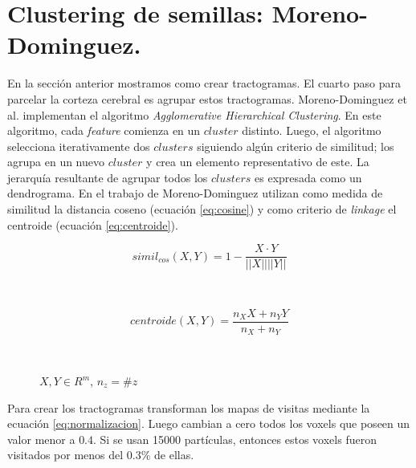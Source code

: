 \section{Clustering de semillas: Moreno-Dominguez.}
\label{sec:clustering_moreno}

En la secci\'on anterior mostramos como crear tractogramas. El cuarto paso
para parcelar la corteza cerebral es agrupar estos tractogramas.
Moreno-Dominguez et al. \cite{Moreno-Dominguez2014} implementan el
algoritmo \textit{Agglomerative Hierarchical Clustering}. En este
algoritmo, cada \textit{feature} comienza en un
$cluster$ distinto. Luego, el algoritmo selecciona iterativamente dos
$clusters$ siguiendo alg\'un criterio de similitud; los agrupa en un nuevo
$cluster$ y crea un elemento representativo de este. La jerarqu\'ia
resultante de agrupar todos los $clusters$ es expresada como un
dendrograma.
En el trabajo de Moreno-Dominguez utilizan como medida de similitud la
distancia coseno (ecuaci\'on \ref{eq:cosine}) y como criterio de 
\textit{linkage} el centroide (ecuaci\'on \ref{eq:centroide}).

\begin{figure}[h!]
                                                                                                                        
\begin{minipage}[b]{0.49\textwidth}
    \begin{equation}
        \label{eq:cosine}
        simil_{cos}(X,Y) = 1 - \frac{ X \cdot Y }{||X|| ||Y||}
    \end{equation}
\end{minipage} ~
\hfill
\begin{minipage}[b]{0.49\textwidth}
    \begin{equation}
        \label{eq:centroide}
        centroide(X,Y) = \frac{ n_X X + n_Y Y}{n_X + n_Y}
    \end{equation}
\end{minipage} ~

\centering
\vspace{0.5cm}
\small{$X, Y \in R^m$, $n_z = \#z$}

\end{figure}  

Para crear los tractogramas transforman los mapas de visitas mediante la
ecuaci\'on \ref{eq:normalizacion}. Luego cambian a cero todos los voxels
que poseen un valor menor a $0.4$. Si se usan 15000 part\'iculas, entonces 
estos voxels fueron visitados por menos del 0.3\% de ellas. \\

